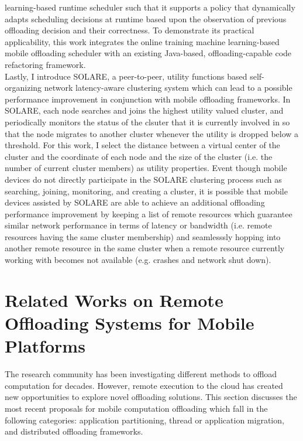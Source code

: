 learning-based runtime scheduler such that it supports a policy that
dynamically adapts scheduling decisions at runtime based upon the
observation of previous offloading decision and their correctness.
%
To demonstrate its practical applicability, this work integrates the
online training machine learning-based mobile offloading scheduler with
an existing Java-based, offloading-capable code refactoring framework.\\ 
%
Lastly, I introduce SOLARE, a peer-to-peer, utility functions based
self-organizing network latency-aware clustering system which can lead
to a possible performance improvement in conjunction with mobile
offloading frameworks.
%
In SOLARE, each node searches and joins the highest utility valued
cluster, and periodically monitors the status of the clsuter that it is
currently involved in so that the node migrates to another cluster
whenever the utility is dropped below a threshold.
%
For this work, I select the distance between a virtual center of the
cluster and the coordinate of each node and the size of the cluster
(i.e. the number of current cluster members) as utility properties.
%
Event though mobile devices do not directly participate in the SOLARE
clustering process such as searching, joining, monitoring, and creating
a cluster, it is possible that mobile devices assisted by SOLARE
are able to achieve an additional offloading performance improvement by
keeping a list of remote resources which guarantee similar network
performance in terms of latency or bandwidth (i.e. remote resources
having the same cluster membership) and seamlesssly hopping into another
remote resource in the same cluster when a remote resource currently
working with becomes not available (e.g. crashes and network shut down).

\section{Related Works on Remote Offloading Systems for Mobile Platforms}
\label{intro:relatedwork}

The research community has been investigating different methods to
offload computation for decades.
%
However, remote execution to the cloud has created new opportunities to
explore novel offloading solutions.
%
This section discusses the most recent proposals for mobile computation
offloading which fall in the following categories: application
partitioning, thread or application migration, and distributed
offloading frameworks.
%
